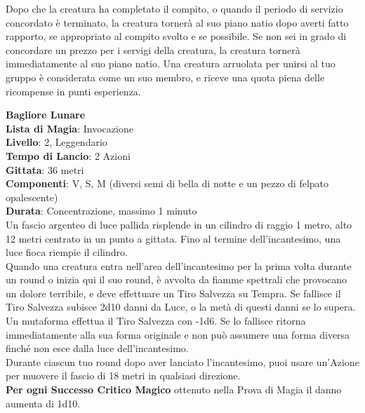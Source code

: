 \documentclass[a4paper,twoside,openany]{book}
\begin{document}
\begin{multicols}{2}
Dopo che la creatura ha completato il compito, o quando il periodo di servizio concordato è terminato, la creatura tornerà al suo piano natio dopo averti fatto rapporto, se appropriato al compito svolto e se possibile. Se non sei in grado di concordare un prezzo per i servigi della creatura, la creatura tornerà immediatamente al suo piano natio. Una creatura arruolata per unirsi al tuo gruppo è considerata come un suo membro, e riceve una quota piena delle ricompense in punti esperienza.

\medskip\textbf{Bagliore Lunare}\\
\textbf{Lista di Magia}: Invocazione\\
\textbf{Livello}: 2, Leggendario\\
\textbf{Tempo di Lancio}: 2 Azioni\\
\textbf{Gittata}: 36 metri\\
\textbf{Componenti}: V, S, M (diversi semi di bella di notte e un pezzo di felpato opalescente)\\
\textbf{Durata}: Concentrazione, massimo 1 minuto\\
Un fascio argenteo di luce pallida risplende in un cilindro di raggio 1 metro, alto 12 metri centrato in un punto a gittata. Fino al termine dell'incantesimo, una luce fioca riempie il cilindro. \\
Quando una creatura entra nell'area dell'incantesimo per la prima volta durante un round o inizia qui il suo round, è avvolta da fiamme spettrali che provocano un dolore terribile, e deve effettuare un Tiro Salvezza su Tempra. Se fallisce il Tiro Salvezza subisce 2d10 danni da Luce, o la metà di questi danni se lo supera. Un mutaforma effettua il Tiro Salvezza con -1d6. Se lo fallisce ritorna immediatamente alla sua forma originale e non può assumere una forma diversa finché non esce dalla luce dell'incantesimo.\\
Durante ciascun tuo round dopo aver lanciato l'incantesimo, puoi usare un'Azione per muovere il fascio di 18 metri in qualsiasi direzione. \\
\textbf{Per ogni Successo Critico Magico} ottenuto nella Prova di Magia il danno aumenta di 1d10.


\end{multicols}
\end{document}
